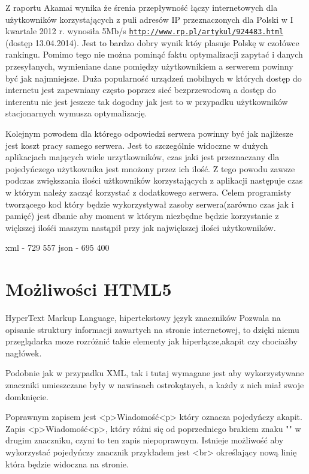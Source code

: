Z raportu Akamai wynika że śrenia przepływność łączy internetowych dla użytkowników korzystających z puli adresów IP przeznaczonych dla Polski w I kwartale 2012 r. wynosiła 5Mb/s  \underline{\texttt{http://www.rp.pl/artykul/924483.html}} (dostęp 13.04.2014). Jest to bardzo dobry wynik któy plasuje Polskę w czołówce rankingu. Pomimo tego nie można pominąć faktu optymalizacji zapytać i danych przesyłanych, wymieniane dane pomiędzy użytkownikiem a serwerem powinny być jak najmniejsze. Duża popularność urządzeń mobilnych w których dostęp do internetu jest zapewniany często poprzez sieć bezprzewodową a dostęp do interentu nie jest jeszcze tak dogodny jak jest to w przypadku użytkowników stacjonarnych  wymusza optymalizację.

Kolejnym powodem dla którego odpowiedzi serwera powinny być jak najlżesze jest koszt pracy samego serwera. Jest to szczególnie widoczne w dużych aplikacjach mających wiele urzytkowników, czas jaki jest przeznaczany dla pojedyńczego użytkownika jest mnożony przez ich ilość. Z tego powodu zawsze podczas zwiększania ilości użtkowników korzystających z aplikacji następuje czas w którym należy zacząć korzystać z dodatkowego serwera. Celem programisty tworzącego kod który będzie wykorzystywał zasoby serwera(zarówno czas jak i pamięć) jest dbanie aby moment w którym niezbędne będzie korzystanie z większej ilośći maszym nastąpił przy jak największej ilości użytkowników.

xml - 729  557
json - 695  400


\section{Możliwości HTML5}
\label{sec:html5}
\nocite{proHTML5}
HyperText Markup Language,  hipertekstowy język znaczników
Pozwala na opisanie struktury informacji zawartych na stronie internetowej, to dzięki niemu przeglądarka moze rozróżnić takie elementy jak hiperłącze,akapit czy chociażby nagłówek.

Podobnie jak w przypadku XML, tak i tutaj wymagane jest aby wykorzystywane znaczniki umieszczane były w nawiasach ostrokątnych, a każdy z nich miał swoje domknięcie.

Poprawnym zapisem jest <p>Wiadomość<p> który oznacza pojedyńczy akapit. Zapis <p>Wiadomość<p>, który różni się od poprzedniego brakiem znaku "" w drugim znaczniku, czyni to ten zapis niepoprawnym. Istnieje możliwość aby wykorzystać pojedyńczy znacznik przykładem jest <br> określający nową linię która będzie widoczna na stronie.

